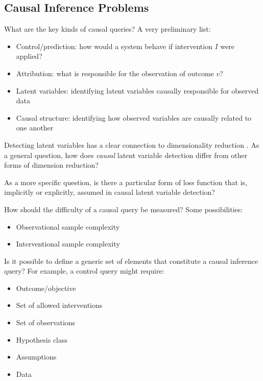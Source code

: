 \subsection{Causal Inference Problems}

\begin{question}\label{q:causal_queries}
    What are the key kinds of causal queries? A very preliminary list:
    \begin{itemize}
        \item Control/prediction: how would a system behave if intervention $I$ were applied?
        \item Attribution: what is responsible for the observation of outcome $v$?
        \item Latent variables: identifying latent variables causally responsible for observed data
        \item Causal structure: identifying how observed variables are causally related to one another
    \end{itemize}
\end{question}

\begin{question}
    Detecting latent variables has a clear connection to dimensionality reduction \cite{kummerfeld_causal_2016}. As a general question, how does \emph{causal} latent variable detection differ from other forms of dimension reduction?
    
    As a more specific question, is there a particular form of loss function that is, implicitly or explicitly, assumed in causal latent variable detection? 
\end{question}

\begin{question}\label{q:causal_query_difficulty}
    How should the difficulty of a causal query be measured?
    Some possibilities:
    \begin{itemize}
        \item Observational sample complexity
        \item Interventional sample complexity
    \end{itemize}
\end{question}

\begin{question}
    Is it possible to define a generic set of elements that constitute a causal inference query? For example, a control query might require:
    \begin{itemize}
        \item Outcome/objective
        \item Set of allowed interventions
        \item Set of observations
        \item Hypothesis class
        \item Assumptions
        \item Data
    \end{itemize}
\end{question}

